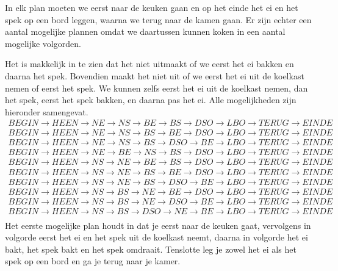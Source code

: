 \documentclass[alternative-exam.tex]{subfiles}
\begin{document}
In elk plan moeten we eerst naar de keuken gaan en op het einde het ei en het spek op een bord leggen, waarna we terug naar de kamen gaan. Er zijn echter een aantal mogelijke plannen omdat we daartussen kunnen koken in een aantal mogelijke volgorden.

Het is makkelijk in te zien dat het niet uitmaakt of we eerst het ei bakken en daarna het spek. Bovendien maakt het niet uit of we eerst het ei uit de koelkast nemen of eerst het spek. We kunnen zelfs eerst het ei uit de koelkast nemen, dan het spek, eerst het spek bakken, en daarna pas het ei. Alle mogelijkheden zijn hieronder samengevat.
\[
\begin{array}{c}
BEGIN \rightarrow HEEN \rightarrow NE \rightarrow NS \rightarrow BE \rightarrow BS \rightarrow DSO\rightarrow LBO \rightarrow TERUG \rightarrow EINDE\\
BEGIN \rightarrow HEEN \rightarrow NE \rightarrow NS \rightarrow BS \rightarrow BE \rightarrow DSO\rightarrow LBO \rightarrow TERUG \rightarrow EINDE\\
BEGIN \rightarrow HEEN \rightarrow NE \rightarrow NS \rightarrow BS \rightarrow DSO \rightarrow BE\rightarrow LBO \rightarrow TERUG \rightarrow EINDE\\
BEGIN \rightarrow HEEN \rightarrow NE \rightarrow BE \rightarrow NS \rightarrow BS \rightarrow DSO\rightarrow LBO \rightarrow TERUG \rightarrow EINDE\\
BEGIN \rightarrow HEEN \rightarrow NS \rightarrow NE \rightarrow BE \rightarrow BS \rightarrow DSO\rightarrow LBO \rightarrow TERUG \rightarrow EINDE\\
BEGIN \rightarrow HEEN \rightarrow NS \rightarrow NE \rightarrow BS \rightarrow BE \rightarrow DSO\rightarrow LBO \rightarrow TERUG \rightarrow EINDE\\
BEGIN \rightarrow HEEN \rightarrow NS \rightarrow NE \rightarrow BS \rightarrow DSO \rightarrow BE\rightarrow LBO \rightarrow TERUG \rightarrow EINDE\\
BEGIN \rightarrow HEEN \rightarrow NS \rightarrow BS \rightarrow NE \rightarrow BE \rightarrow DSO\rightarrow LBO \rightarrow TERUG \rightarrow EINDE\\
BEGIN \rightarrow HEEN \rightarrow NS \rightarrow BS \rightarrow NE \rightarrow DSO \rightarrow BE\rightarrow LBO \rightarrow TERUG \rightarrow EINDE\\
BEGIN \rightarrow HEEN \rightarrow NS \rightarrow BS \rightarrow DSO \rightarrow NE \rightarrow BE\rightarrow LBO \rightarrow TERUG \rightarrow EINDE\\
\end{array}
\]
Het eerste mogelijke plan houdt in dat je eerst naar de keuken gaat, vervolgens in volgorde eerst het ei en het spek uit de koelkast neemt, daarna in volgorde het ei bakt, het spek bakt en het spek omdraait. Tenslotte leg je zowel het ei als het spek op een bord en ga je terug naar je kamer.
\end{document}

